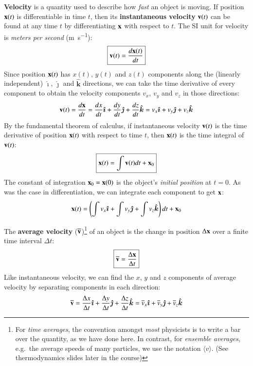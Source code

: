 \documentclass{../../oss-handout}
\newcommand{\mb}[1]{\ensuremath\mathbf{#1}}
\begin{document}
\textbf{Velocity} is a quantity used to describe how \emph{fast} an object is
moving. If position $\mb{x}(t)$ is differentiable in time $t$, then its
\textbf{instantaneous velocity} $\mb{v}(t)$ can be found at any time $t$ by
differentiating $\mb{x}$ with respect to $t$. The SI unit for velocity is
\emph{meters per second} (\si{\metre\per\second}):
\begin{equation}
  \boxed{\mb{v}(t)= \frac{d\mb{x}(t)}{dt}}
\end{equation}
Since position $\mb{x}(t)$ has $x(t)$, $y(t)$ and $z(t)$ components along the
(linearly independent) $\bm{\hat{\imath}}$, $\bm{\hat{\jmath}}$ and
$\bm{\hat{k}}$ directions, we can take the time derivative of every component
to obtain the velocity components $v_x$, $v_y$ and $v_z$ in those directions:
\begin{equation*}
  \mb{v}(t)= \frac{d\mb{x}}{dt}=
  \frac{dx}{dt}\bm{\hat{\imath}} +
  \frac{dy}{dt}\bm{\hat{\jmath}} + \frac{dz}{dt}\bm{\hat{k}}=
  v_x\bm{\hat{\imath}} + v_y\bm{\hat{\jmath}} + v_z\bm{\hat{k}}
\end{equation*}
By the fundamental theorem of calculus, if instantaneous velocity $\mb{v}(t)$
is the time derivative of position $\mb{x}(t)$ with respect to time $t$, then
$\mb{x}(t)$ is the time integral of $\mb{v}(t)$:
\begin{equation}
  \boxed{\mb{x}(t)=\int\mb{v}(t)dt + \mb{x}_0}
\end{equation}
The constant of integration $\mb{x}_0=\mb{x}(0)$ is the object's
\emph{initial position} at $t=0$. As was the case in differentiation,
we can integrate each component to get $\mb{x}$:
\begin{equation*}
  \mb{x}(t)= \left(
  \int v_x\bm{\hat{\imath}} + \int v_y\bm{\hat{\jmath}} + \int v_z\bm{\hat{k}}
  \right) dt + \mb{x}_0
\end{equation*}


The \textbf{average velocity} ($\overline{\mb{v}}$)\footnote{For
  \emph{time averages}, the convention amongst \emph{most} physicists is to
  write a bar over the quantity, as we have done here. In contrast, for
  \emph{ensemble averages}, e.g.\ the average speeds of many particles, we use
  the notation $\big\langle v\big\rangle$. (See thermodynamics slides later in
  the course)} of an object is the change in position $\Delta\mb{x}$ over a
finite time interval $\Delta t$:
\begin{equation}
  \boxed{\overline{\mb{v}}= \frac{\Delta\mb{x}}{\Delta t}}
\end{equation}
Like instantaneous velocity, we can find the $x$, $y$ and $z$ components of
average velocity by separating components in each direction:
\begin{equation*}
  \overline{\mb{v}}=
  \frac{\Delta x}{\Delta t}\bm{\hat{\imath}} +
  \frac{\Delta y}{\Delta t}\bm{\hat{\jmath}} +
  \frac{\Delta z}{\Delta t}\bm{\hat{k}} =
  \overline{v}_x\bm{\hat{\imath}} +
  \overline{v}_y\bm{\hat{\jmath}} +
  \overline{v}_z\bm{\hat{k}}
\end{equation*}
\end{document}
